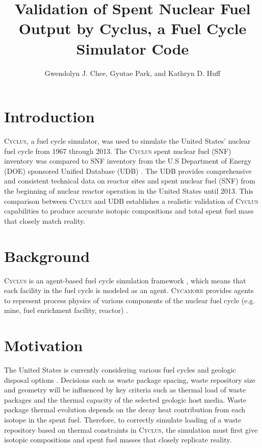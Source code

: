 \documentclass{anstrans}
\title{Validation of Spent Nuclear Fuel Output by Cyclus, a Fuel Cycle Simulator Code}
\author{Gwendolyn J. Chee, Gyutae Park, and Kathryn D. Huff}
\institute{
Dept. of Nuclear, Plasma and Radiological Engineering, University of Illinois at Urbana-Champaign \\
gchee2@illinois.edu
}
\newcommand{\Cyclus}{\textsc{Cyclus}\xspace}%
\newcommand{\Cycamore}{\textsc{Cycamore}\xspace}%
\begin{document}
\section{Introduction}
\Cyclus \cite{carlsen_cyclus_2014}, a fuel cycle simulator, was used to simulate the
United States' nuclear fuel cycle from 1967 through 2013. The \Cyclus spent nuclear fuel (SNF) inventory was compared to SNF inventory from the U.S Department of Energy (DOE) sponsored Unified Database (UDB) \cite{peterson_unf-st&dards_2017}. The UDB provides comprehensive and consistent technical data on reactor sites and spent nuclear fuel (SNF) from the beginning of nuclear reactor operation in the United States until 2013. This comparison between \Cyclus and UDB establishes a realistic validation of \Cyclus capabilities to produce accurate isotopic compositions and total spent fuel mass that closely match reality. 

\section{Background}
\Cyclus is an agent-based fuel cycle simulation framework \cite{huff_fundamental_2016}, which means that each facility in the fuel cycle is modeled as an agent. \Cycamore \cite{carlsen_cycamore_2014} provides agents to represent process physics of various components of the nuclear fuel cycle (e.g. mine, fuel enrichment facility, reactor) \cite{huff_extensions_2014}. 

\section{Motivation}
The United States is currently considering various fuel cycles and geologic disposal options
\cite{DOE_strategy_2013}. Decisions such as waste package spacing, waste repository size and geometry will be influenced by key criteria such as thermal load of waste packages and the thermal capacity of the selected geologic host media. Waste package thermal evolution depends on the decay heat contribution from each isotope in the spent fuel. Therefore, to correctly simulate loading of a waste repository based on thermal constraints in \Cyclus, the simulation must first give isotopic compositions and spent fuel masses that closely replicate reality. 

\end{document}
